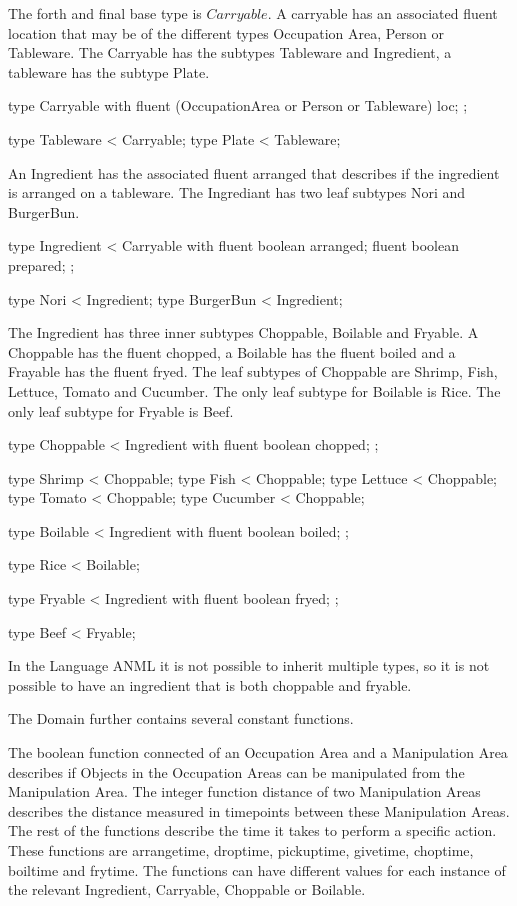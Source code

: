 The forth and final base type is $Carryable$.
A carryable has an associated fluent location that may be of the different types Occupation Area, Person or Tableware.
The Carryable has the subtypes Tableware and Ingredient, a tableware has the subtype Plate.

\begin{anmlcode}
type Carryable with {
  fluent (OccupationArea or Person or Tableware) loc;
};

type Tableware < Carryable;
type Plate < Tableware;
\end{anmlcode}

An Ingredient has the associated fluent arranged that describes if the ingredient is arranged on a tableware.
The Ingrediant has two leaf subtypes Nori and BurgerBun.

\begin{anmlcode}
type Ingredient < Carryable with {
  fluent boolean arranged;
  fluent boolean prepared;
};

type Nori < Ingredient;
type BurgerBun < Ingredient;
\end{anmlcode}

The Ingredient has three inner  subtypes Choppable, Boilable and Fryable.
A Choppable has the fluent chopped, a Boilable has the fluent boiled and a Frayable has the fluent fryed.
The leaf subtypes of Choppable are Shrimp, Fish, Lettuce, Tomato and Cucumber.
The only leaf subtype for Boilable is Rice.
The only leaf subtype for Fryable is Beef.

\begin{anmlcode}
type Choppable < Ingredient with {
  fluent boolean chopped;
};

type Shrimp < Choppable;
type Fish < Choppable;
type Lettuce < Choppable;
type Tomato < Choppable;
type Cucumber < Choppable;

type Boilable < Ingredient with {
  fluent boolean boiled;
};

type Rice < Boilable;


type Fryable < Ingredient with {
  fluent boolean fryed;
};

type Beef < Fryable;
\end{anmlcode}

In the Language ANML it is not possible to inherit multiple types, so it is not possible to have an ingredient that is both choppable and fryable.

The Domain further contains several constant functions.

The boolean function connected of an Occupation Area and a Manipulation Area describes if Objects in the Occupation Areas can be manipulated from the Manipulation Area.
The integer function distance of two Manipulation Areas describes the distance measured in timepoints between these Manipulation Areas.
The rest of the functions describe the time it takes to perform a specific action.
These functions are arrangetime, droptime, pickuptime, givetime, choptime, boiltime and frytime.
The functions can have different values for each instance of the relevant Ingredient, Carryable, Choppable or Boilable.

